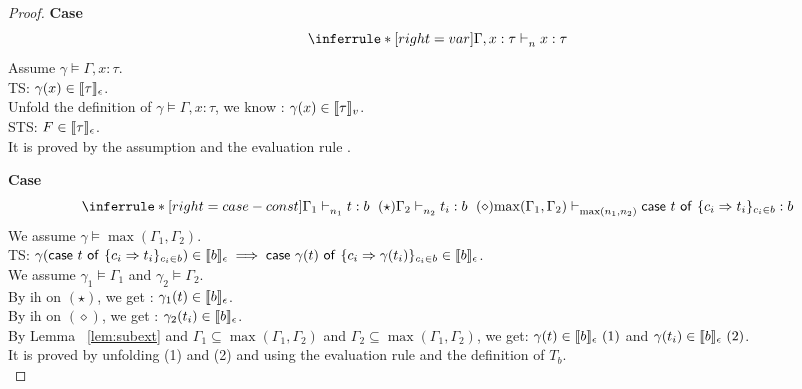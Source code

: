 \documentclass{article}
\begin{document}
\begin{proof}
    
     \noindent \textbf{Case} 
     \[
       \inferrule*[ right = var]
   {\empty}
   {\Gamma, x:\tau \jtype{n}{}{x}{\tau}  } 
     \]
    Assume $\gamma \vDash \Gamma, x: \tau $.\\
    TS: $\gamma(x) \in \llbracket {\tau} \rrbracket_{\epsilon} $.\\
    Unfold the definition of $\gamma \vDash{\Gamma, x: \tau}$, we know : $ \gamma(x) \in \llbracket {\tau} \rrbracket_{v} $. \\
    STS: $ F \in \llbracket {\tau} \rrbracket_{\epsilon} $.\\
    
   It is proved by the assumption and the evaluation rule .
 
 \noindent \textbf{Case}
  \[
   \inferrule*[ right = case-const ]
   {\Gamma_1 \jtype{n_1}{}{t}{b} ~(\star) \\ \Gamma_2 \jtype{n_2}{}{t_i}{b}~(\diamond) }
   {\max(\Gamma_1, \Gamma_2) \jtype{\max(n_1,n_2)}{}{\tcaseof{t}\ \{c_i \Rightarrow t_i\}_{c_i \in b} } {b} }
  \]
  We assume $ \gamma \vDash \max(\Gamma_1,\Gamma_2)$.\\
  TS: $\gamma( \mathsf{case}~t~\mathsf{of}\ \{c_i \Rightarrow t_i\}_{c_i \in b}  )  \in \llbracket {b} \rrbracket_{\epsilon} \implies \mathsf{case}~\gamma(t)~\mathsf{of}\ \{c_i \Rightarrow \gamma(t_i)\}_{c_i \in b} \in \llbracket {b} \rrbracket_{\epsilon}$.\\
  We assume $\gamma_1 \vDash \Gamma_1$ and $\gamma_2 \vDash \Gamma_2 $.\\
  By ih on $(\star)$, we get : $ \gamma_1(t) \in \llbracket {b} \rrbracket_{\epsilon}$.\\
  By ih on $(\diamond)$, we get : $ \gamma_2(t_i) \in \llbracket {b} \rrbracket_{\epsilon}$.\\
  By Lemma ~\ref{lem:subext} and $\Gamma_1 \subseteq \max(\Gamma_1,\Gamma_2) $ and $ \Gamma_2 \subseteq \max(\Gamma_1,\Gamma_2) $, we get: $\gamma(t) \in \llbracket {b} \rrbracket_{\epsilon}~(1) $ and $ \gamma(t_i) \in \llbracket {b} \rrbracket_{\epsilon}~(2)$.\\
  It is proved by unfolding (1) and (2) and using the evaluation rule  and the definition of $T_b$.\\ 
  

\end{proof}
\end{document}
